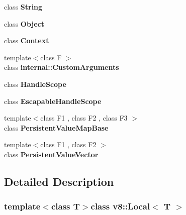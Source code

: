 \begin{DoxyCompactItemize}
\item 
\hypertarget{classv8_1_1_local_a7fb804f7dc96dd9f705c84095f37f1ca}{}class {\bfseries String}\label{classv8_1_1_local_a7fb804f7dc96dd9f705c84095f37f1ca}

\item 
\hypertarget{classv8_1_1_local_a0720b5f434e636e22a3ed34f847eec57}{}class {\bfseries Object}\label{classv8_1_1_local_a0720b5f434e636e22a3ed34f847eec57}

\item 
\hypertarget{classv8_1_1_local_ac26c806e60ca4a0547680edb68f6e39b}{}class {\bfseries Context}\label{classv8_1_1_local_ac26c806e60ca4a0547680edb68f6e39b}

\item 
\hypertarget{classv8_1_1_local_a07108678a2af25caab612879ed7dca62}{}{\footnotesize template$<$class F $>$ }\\class {\bfseries internal\+::\+Custom\+Arguments}\label{classv8_1_1_local_a07108678a2af25caab612879ed7dca62}

\item 
\hypertarget{classv8_1_1_local_a5f127e488db492b05c8542cec0b880b7}{}class {\bfseries Handle\+Scope}\label{classv8_1_1_local_a5f127e488db492b05c8542cec0b880b7}

\item 
\hypertarget{classv8_1_1_local_ade20a528f8ee42d426959f061cff29ff}{}class {\bfseries Escapable\+Handle\+Scope}\label{classv8_1_1_local_ade20a528f8ee42d426959f061cff29ff}

\item 
\hypertarget{classv8_1_1_local_a08e2b8f164392d71811ce6cc134f33e3}{}{\footnotesize template$<$class F1 , class F2 , class F3 $>$ }\\class {\bfseries Persistent\+Value\+Map\+Base}\label{classv8_1_1_local_a08e2b8f164392d71811ce6cc134f33e3}

\item 
\hypertarget{classv8_1_1_local_a978bb1377559897d74d5fe883a54a315}{}{\footnotesize template$<$class F1 , class F2 $>$ }\\class {\bfseries Persistent\+Value\+Vector}\label{classv8_1_1_local_a978bb1377559897d74d5fe883a54a315}

\end{DoxyCompactItemize}


\subsection{Detailed Description}
\subsubsection*{template$<$class T$>$class v8\+::\+Local$<$ T $>$}

